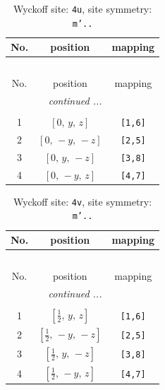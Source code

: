 \documentclass[fleqn,8pt]{jsarticle}
\begin{document}
\begin{longtable}{ccc}
\caption{Wyckoff site: {\tt 4u}, site symmetry: {\tt m'..}}
 \\
 \hline \hline
No. & position & mapping \\ \hline \endfirsthead

\multicolumn{2}{l}{\tablename\ \thetable{}} \\
 \hline \hline
No. & position & mapping \\ \hline \endhead

 \hline \hline
\multicolumn{2}{r}{\footnotesize\it continued ...} \\ \endfoot

 \hline \hline
\multicolumn{2}{r}{} \\ \endlastfoot

1 & $\left[ 0,\, y,\, z \right]$ & {\tt [1,6]} \\ \hline
2 & $\left[ 0,\, - y,\, - z \right]$ & {\tt [2,5]} \\ \hline
3 & $\left[ 0,\, y,\, - z \right]$ & {\tt [3,8]} \\ \hline
4 & $\left[ 0,\, - y,\, z \right]$ & {\tt [4,7]} \\
\end{longtable}
\renewcommand{\arraystretch}{1.2}
\begin{longtable}{ccc}
\caption{Wyckoff site: {\tt 4v}, site symmetry: {\tt m'..}}
 \\
 \hline \hline
No. & position & mapping \\ \hline \endfirsthead

\multicolumn{2}{l}{\tablename\ \thetable{}} \\
 \hline \hline
No. & position & mapping \\ \hline \endhead

 \hline \hline
\multicolumn{2}{r}{\footnotesize\it continued ...} \\ \endfoot

 \hline \hline
\multicolumn{2}{r}{} \\ \endlastfoot

1 & $\left[ \frac{1}{2},\, y,\, z \right]$ & {\tt [1,6]} \\ \hline
2 & $\left[ \frac{1}{2},\, - y,\, - z \right]$ & {\tt [2,5]} \\ \hline
3 & $\left[ \frac{1}{2},\, y,\, - z \right]$ & {\tt [3,8]} \\ \hline
4 & $\left[ \frac{1}{2},\, - y,\, z \right]$ & {\tt [4,7]} \\
\end{longtable}
\end{document}
